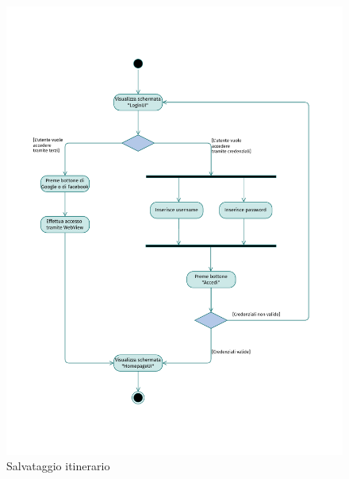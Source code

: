 \documentclass{natourDoc}
\begin{document}
	\newpage
	\begin{figure}[!htbp]
		\centering
		\includegraphics[width=\textwidth, page=12]{./diagrams/activity.pdf}
		\caption{Salvataggio itinerario}
	\end{figure}
	\FloatBarrier
\end{document}

